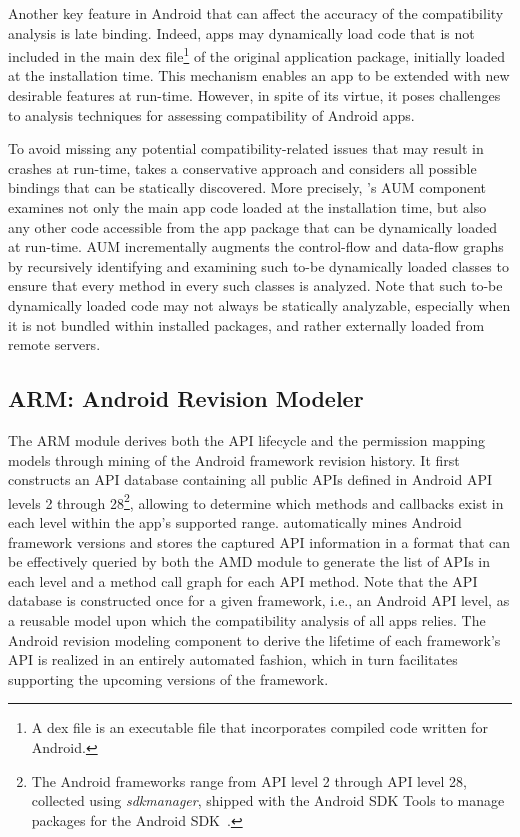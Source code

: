 Another key feature in Android that can affect the accuracy
of the compatibility analysis is late binding.  Indeed, apps
may dynamically load code that is not included in the main
dex file\footnote{A dex file is an executable file that
incorporates compiled code written for Android.} of the
original application package, initially loaded at the
installation time.  This mechanism enables an app to be
extended with new desirable features at run-time. However,
in spite of its virtue, it poses challenges to analysis
techniques for assessing compatibility of Android apps.

To avoid missing any potential compatibility-related issues
that may result in crashes at run-time, \@approach takes a
conservative approach and considers all possible bindings
that can be statically discovered.  More precisely,
\@approach's AUM component examines not only the main app
code loaded at the installation time, but also any other
code accessible from the app package that can be dynamically
loaded at run-time.  AUM incrementally augments the
control-flow and data-flow graphs by recursively identifying
and examining such to-be dynamically loaded classes to
ensure that every method in every such classes is analyzed.
Note that such to-be dynamically loaded code may not always
be statically analyzable, especially when it is not bundled
within installed packages, and rather externally loaded from
remote servers.
  
\subsection{ARM: Android Revision Modeler} 

The ARM module derives both the API lifecycle and the permission mapping models through mining of the Android framework revision history.
It first constructs an API database containing all public APIs defined in Android API levels 2 through 28\footnote{The Android frameworks range from API level 2 through API level 28, collected using {\it sdkmanager}, shipped with the Android SDK Tools to manage packages for the Android SDK~\cite{sdkmanager}. }, allowing \@approach to determine which methods and callbacks exist in each level within the app's supported range. \@approach automatically mines Android framework versions and stores the captured API information in a format that can be effectively queried by both the AMD module to generate the list of APIs in each level and a method call graph for each API method.
Note that the API database is constructed once for a given framework, i.e., an Android API level, as a reusable model upon which the compatibility analysis of all apps relies.
The Android revision modeling component to derive the lifetime of each framework's API is realized in an entirely automated fashion, which in turn facilitates supporting the upcoming versions of the framework.  



